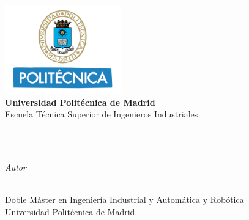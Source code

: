 %


\begin{titlepage}
	\tgherosfont
	\centering
	\includegraphics[width=5cm]{figuras/logos/logo_upm_crop.png} \\[1mm]
	{\Large \textbf{Universidad Politécnica de Madrid}}\\[1mm]
	{\large Escuela Técnica Superior de Ingenieros Industriales}\\[10mm]
	

	\hrulefill
	\vfill
    
	{\LARGE \MakeUppercase{\thesisSubject}} \\[5mm]
	{\Huge \color{ctcolortitle}\textbf{\thesisTitle} \\[10mm]}

	\begin{minipage}[t]{.27\textwidth}
		\raggedleft
		\textit{Autor}
	\end{minipage}
	\hspace*{15pt}
	\begin{minipage}[t]{.65\textwidth}
		{\Large \thesisName} \\
	  	{\small Doble Máster en Ingeniería Industrial y Automática y Robótica} \\[-1mm]
		{\small Universidad Politécnica de Madrid}
	\end{minipage} \\[10mm]
	\vfill
	\hrulefill
	

\end{titlepage}
